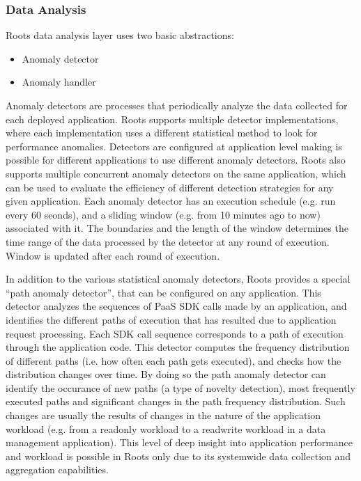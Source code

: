 \subsubsection{Data Analysis}
Roots data analysis layer uses two basic abstractions:
\begin{itemize}
\item Anomaly detector
\item Anomaly handler
\end{itemize}

Anomaly detectors are processes that periodically analyze the data collected for
each deployed application. Roots supports multiple detector implementations, where each implementation
uses a different statistical method to look for performance anomalies. Detectors are configured
at application level making is possible for different applications to use different anomaly 
detectors. Roots also supports multiple concurrent anomaly detectors on the same application, which can be used
to evaluate the efficiency of different detection strategies for any given application. Each
anomaly detector has an execution schedule (e.g. run every 60 seonds), and a sliding window 
(e.g. from 10 minutes ago to now)
associated with it. The boundaries and the length of the window determines the time range
of the data processed by the detector at any round of execution. Window is updated 
after each round of execution.

In addition to the various statistical anomaly detectors, Roots provides a special
``path anomaly detector'', that can be configured on any application. This detector
analyzes the sequences of PaaS SDK calls made by an application, and identifies the
different paths of execution that has resulted due to application request processing.
Each SDK call sequence corresponds to a path of execution through the application code.
This detector computes the frequency distribution of different paths (i.e. how often each path
gets executed), and checks how the distribution changes over time. By doing so the path anomaly
detector can identify the occurance of new paths (a type of novelty detection), most
frequently executed paths and
significant changes in the path frequency distribution. Such changes are usually
the results of changes in the nature of the application workload (e.g. from a readonly
workload to a readwrite workload in a data management application). 
This level of deep insight into application
performance and workload is possible in Roots only due to its systemwide data
collection and aggregation capabilities.

